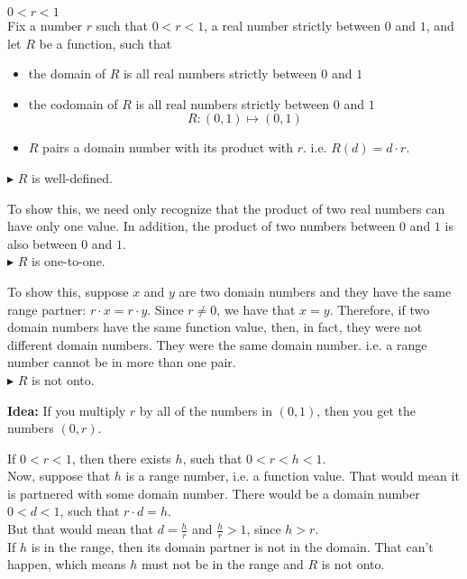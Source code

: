 \documentclass{ximera}
\begin{document}
\begin{example} $0 < r < 1$ \\
Fix a number $r$ such that $0 < r < 1$, a real number strictly between $0$ and $1$, and let $R$ be a function, such that

\begin{itemize}
\item the domain of $R$ is all real numbers strictly between $0$ and $1$  
\item the codomain of $R$ is all real numbers strictly between $0$ and $1$  
\[
R : (0,1) \mapsto (0,1)
\]
\item $R$ pairs a domain number with its product with $r$. i.e. $R(d) = d \cdot r$.
\end{itemize}





$\blacktriangleright$ $R$ is well-defined.  

To show this, we need only recognize that the product of two real numbers can have only one value.  In addition, the product of two numbers between $0$ and $1$ is also between $0$ and $1$.  \\


$\blacktriangleright$ $R$ is one-to-one. 

To show this, suppose $x$ and $y$ are two domain numbers and they have the same range partner: $r \cdot x = r \cdot y$.  Since $r \ne 0$, we have that $x = y$. Therefore, if two domain numbers have the same function value, then, in fact, they were not different domain numbers.  They were the same domain number. i.e. a range number cannot be in more than one pair.\\


$\blacktriangleright$ $R$ is not onto.

\textbf{Idea:} If you multiply $r$ by all of the numbers in $(0,1)$, then you get the numbers $(0,r)$.\\

\begin{explanation}
If $0 < r < 1$, then there exists $h$, such that $0 < r < h < 1$.  \\

Now, suppose that $h$ is a range number, i.e. a function value. That would mean it is partnered with some domain number.  There would be a domain number $0 < d < 1$, such that  $r \cdot d = h$.  \\


But that would mean that $d = \frac{h}{r}$ and $\frac{h}{r} > 1$, since $h > r$.  \\


If $h$ is in the range, then its domain partner is not in the domain.  That can't happen, which means $h$ must not be in the range and $R$ is not onto.
\end{explanation}




\end{example} 
\end{document}
